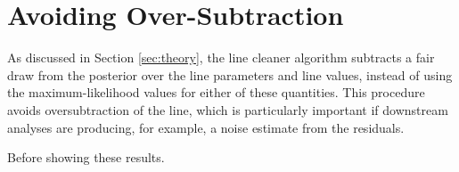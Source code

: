 \documentclass[modern]{aastex631}
\begin{document}
\appendix

\section{Avoiding Over-Subtraction}
\label{sec:oversubtract}

As discussed in Section \ref{sec:theory}, the line cleaner algorithm subtracts a
fair draw from the posterior over the line parameters and line values, instead
of using the maximum-likelihood values for either of these quantities.  This
procedure avoids oversubtraction of the line, which is particularly important if
downstream analyses are producing, for example, a noise estimate from the
residuals.

Before showing these results.



\end{document}
